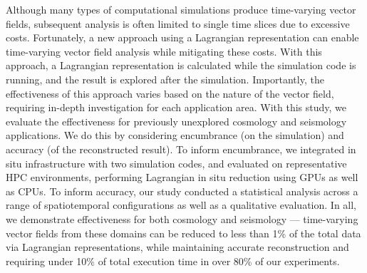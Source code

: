 Although many types of computational simulations produce time-varying vector fields, 
subsequent analysis is often limited to single time slices due to excessive costs.
%
Fortunately, a new approach using a Lagrangian representation can 
enable time-varying vector field analysis while mitigating these costs.
%
With this approach, a Lagrangian representation is calculated while the simulation code is running, and the result is explored after the simulation.
%
Importantly, 
 the effectiveness of this approach varies based on the nature of the vector field, 
requiring in-depth investigation for each application area.
%
With this study, we evaluate the effectiveness for previously unexplored cosmology and seismology
applications. %
%
We do this by considering encumbrance (on the simulation) and accuracy (of the reconstructed result).
%
To inform encumbrance, we 
integrated in situ infrastructure with two simulation codes, 
and evaluated on representative HPC environments,
performing Lagrangian in situ reduction using GPUs as well as CPUs.
%
To inform accuracy, our study conducted a statistical analysis across a range of spatiotemporal configurations as well as a qualitative evaluation.
%
In all, we demonstrate effectiveness for both cosmology and seismology --- time-varying vector fields from these domains can be reduced to less than 1\% of the total data via Lagrangian representations, while maintaining accurate reconstruction and requiring under 10\% of total execution time in over 80\% of our experiments.
